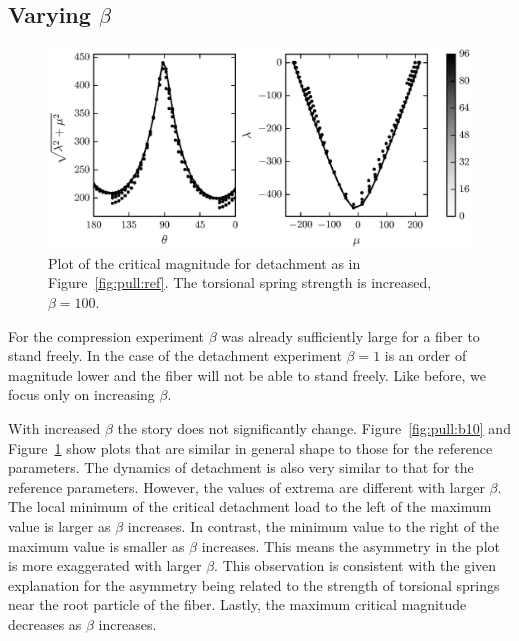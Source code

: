 \subsection{Varying $\beta$}

   \begin{figure}[t]
      \begin{center}
         \includegraphics{./fig/ch3/pull/b100/grid.eps}
      \end{center}      
      \caption{Plot of the critical magnitude for detachment as in Figure~\ref{fig:pull:ref}. The torsional spring strength is increased, $\beta=100$.
      \label{fig:pull:b100}}
   \end{figure}

For the compression experiment $\beta$ was already sufficiently large for a fiber to stand freely. In the case of the detachment experiment $\beta=1$ is an order of magnitude lower and the fiber will not be able to stand freely. Like before, we focus only on increasing $\beta$.

With increased $\beta$ the story does not significantly change. Figure~\ref{fig:pull:b10} and Figure~\ref{fig:pull:b100} show plots that are similar in general shape to those for the reference parameters. The dynamics of detachment is also very similar to that for the reference parameters. However, the values of extrema are different with larger $\beta$. The local minimum of the critical detachment load to the left of the maximum value is larger as $\beta$ increases. In contrast, the minimum value to the right of the maximum value is smaller as $\beta$ increases. This means the asymmetry in the plot is more exaggerated with larger $\beta$. This observation is consistent with the given explanation for the asymmetry being related to the strength of torsional springs near the root particle of the fiber. Lastly, the maximum critical magnitude decreases as $\beta$ increases.

